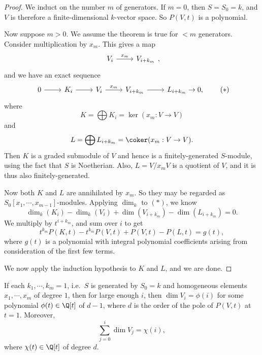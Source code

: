 \documentclass[a4paper]{article}
\begin{document}
\begin{proof}
  We induct on the number $m$ of generators. If $m = 0$, then $S = S_0 = k$, and $V$ is therefore a finite-dimensional $k$-vector space. So $P(V, t)$ is a polynomial.

  Now suppose $m > 0$. We assume the theorem is true for $<m$ generators. Consider multiplication by $x_m$. This gives a map
  \[
    \begin{tikzcd}
      V_i \ar[r, "x_m"] & V_{i + k_m}
    \end{tikzcd},
  \]
  and we have an exact sequence
  \[
    \begin{tikzcd}
      0 \ar[r] & K_i \ar[r] & V_i \ar[r, "x_m"] & V_{i + k_m}\ar [r] & L_{i + k_m} \to 0,
    \end{tikzcd}\tag{$*$}
  \]
  where
  \[
    K = \bigoplus K_i = \ker (x_m: V \to V)
  \]
  and
  \[
    L = \bigoplus L_{i + k_m} = \coker (x_m: V \to V).
  \]
  Then $K$ is a graded submodule of $V$ and hence is a finitely-generated $S$-module, using the fact that $S$ is Noetherian. Also, $L = V/x_m V$ is a quotient of $V$, and it is thus also finitely-generated.

  Now both $K$ and $L$ are annihilated by $x_m$. So they may be regarded as $S_0[x_1, \cdots, x_{m - 1}]$-modules. Applying $\dim_k$ to $(*)$, we know
  \[
    \dim_k (K_i) - \dim_k (V_i) + \dim (V_{i + k_m}) - \dim (L_{i + k_m}) = 0.
  \]
  We multiply by $t^{i + k_m}$, and sum over $i$ to get
  \[
    t^{k_m} P(K, t) - t^{k_m} P(V, t) + P(V, t) - P(L, t) = g(t),
  \]
  where $g(t)$ is a polynomial with integral polynomial coefficients arising from consideration of the first few terms.

  We now apply the induction hypothesis to $K$ and $L$, and we are done.
\end{proof}

\begin{cor}
  If each $k_1, \cdots, k_m = 1$, i.e.\ $S$ is generated by $S_0 = k$ and homogeneous elements $x_1, \cdots, x_m$ of degree $1$, then for large enough $i$, then $\dim V_i = \phi(i)$ for some polynomial $\phi(t) \in \Q[t]$ of $d - 1$, where $d$ is the order of the pole of $P(V, t)$ at $t = 1$. Moreover,
  \[
    \sum_{j = 0}^i \dim V_j = \chi(i),
  \]
  where $\chi(t) \in \Q[t]$ of degree $d$.
\end{cor}
\end{document}
